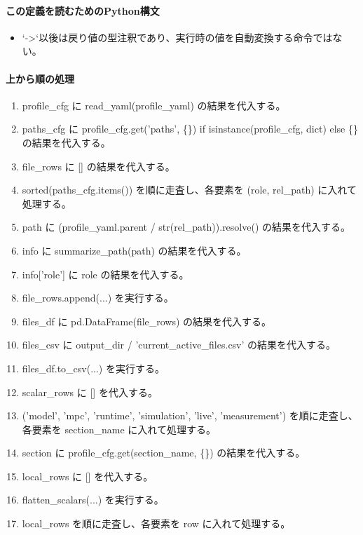 \documentclass[a4paper,11pt]{article}
\begin{document}
            \paragraph{この定義を読むためのPython構文}
            \begin{itemize}[leftmargin=1.6em]
            \item `->`以後は戻り値の型注釈であり、実行時の値を自動変換する命令ではない。
            \end{itemize}
            \paragraph{上から順の処理}
            \begin{enumerate}[leftmargin=1.8em]
            \item profile\_cfg に read\_yaml(profile\_yaml) の結果を代入する。
\item paths\_cfg に profile\_cfg.get('paths', \{\}) if isinstance(profile\_cfg, dict) else \{\} の結果を代入する。
\item file\_rows に [] の結果を代入する。
\item sorted(paths\_cfg.items()) を順に走査し、各要素を (role, rel\_path) に入れて処理する。
\item   path に (profile\_yaml.parent / str(rel\_path)).resolve() の結果を代入する。
\item   info に summarize\_path(path) の結果を代入する。
\item   info['role'] に role の結果を代入する。
\item   file\_rows.append(...) を実行する。
\item files\_df に pd.DataFrame(file\_rows) の結果を代入する。
\item files\_csv に output\_dir / 'current\_active\_files.csv' の結果を代入する。
\item files\_df.to\_csv(...) を実行する。
\item scalar\_rows に [] を代入する。
\item ('model', 'mpc', 'runtime', 'simulation', 'live', 'measurement') を順に走査し、各要素を section\_name に入れて処理する。
\item   section に profile\_cfg.get(section\_name, \{\}) の結果を代入する。
\item   local\_rows に [] を代入する。
\item   flatten\_scalars(...) を実行する。
\item   local\_rows を順に走査し、各要素を row に入れて処理する。

\end{enumerate}
\end{document}

